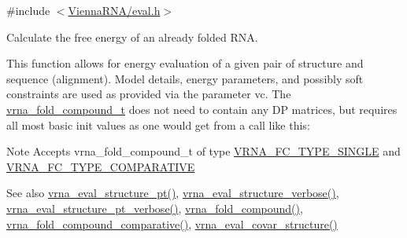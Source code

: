 {\ttfamily \#include $<$\mbox{\hyperlink{eval_8h}{Vienna\+R\+N\+A/eval.\+h}}$>$}



Calculate the free energy of an already folded R\+NA. 

This function allows for energy evaluation of a given pair of structure and sequence (alignment). Model details, energy parameters, and possibly soft constraints are used as provided via the parameter \textquotesingle{}vc\textquotesingle{}. The \mbox{\hyperlink{group__fold__compound_ga1b0cef17fd40466cef5968eaeeff6166}{vrna\+\_\+fold\+\_\+compound\+\_\+t}} does not need to contain any DP matrices, but requires all most basic init values as one would get from a call like this\+: 
\begin{DoxyCode}{0}
\end{DoxyCode}


\begin{DoxyNote}{Note}
Accepts vrna\+\_\+fold\+\_\+compound\+\_\+t of type \mbox{\hyperlink{group__fold__compound_gga01a4ff86fa71deaaa5d1abbd95a1447da7e264dd3cf2dc9b6448caabcb7763cd6}{V\+R\+N\+A\+\_\+\+F\+C\+\_\+\+T\+Y\+P\+E\+\_\+\+S\+I\+N\+G\+LE}} and \mbox{\hyperlink{group__fold__compound_gga01a4ff86fa71deaaa5d1abbd95a1447dab821ce46ea3cf665be97df22a76f5023}{V\+R\+N\+A\+\_\+\+F\+C\+\_\+\+T\+Y\+P\+E\+\_\+\+C\+O\+M\+P\+A\+R\+A\+T\+I\+VE}}
\end{DoxyNote}
\begin{DoxySeeAlso}{See also}
\mbox{\hyperlink{group__eval_gadbd09372ddfd7a450bbd590c96a6bfe4}{vrna\+\_\+eval\+\_\+structure\+\_\+pt()}}, \mbox{\hyperlink{group__eval_ga0928d699d310178f84ee2351034e5cb5}{vrna\+\_\+eval\+\_\+structure\+\_\+verbose()}}, \mbox{\hyperlink{group__eval_ga8a517cfeeae8c376ae7b1e0c401d38b4}{vrna\+\_\+eval\+\_\+structure\+\_\+pt\+\_\+verbose()}}, \mbox{\hyperlink{group__fold__compound_ga6601d994ba32b11511b36f68b08403be}{vrna\+\_\+fold\+\_\+compound()}}, \mbox{\hyperlink{group__fold__compound_gad6bacc816af274922b13d947f708aa0c}{vrna\+\_\+fold\+\_\+compound\+\_\+comparative()}}, \mbox{\hyperlink{group__eval_ga6cea75c0eb9857fb59172be54cab09e0}{vrna\+\_\+eval\+\_\+covar\+\_\+structure()}}
\end{DoxySeeAlso}

